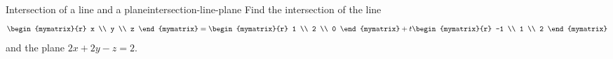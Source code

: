 \begin{example}{Intersection of a line and a plane}{intersection-line-plane}
  Find the intersection of the line
  \begin{equation*}
    \begin{mymatrix}{r} x \\ y \\ z \end{mymatrix}
    = \begin{mymatrix}{r} 1 \\ 2 \\ 0 \end{mymatrix}
    + t \begin{mymatrix}{r} -1 \\ 1 \\ 2 \end{mymatrix}
  \end{equation*}
  and the plane $2x+2y-z = 2$.
\end{example}

